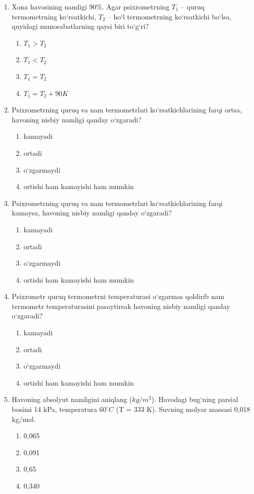 \begin{enumerate}
\item Xona havosining namligi 90\%. Agar psixrometrning $T_1$ – quruq termometrning ko‘rsatkichi, $T_2$ – ho‘l termometrning ko‘rsatkichi bo‘lsa, quyidagi munosabatlarning qaysi biri to‘g‘ri?
\begin{enumerate}[label=\Alph*)]
\item $T_1 > T_2$
\item $T_1 < T_2$
\item $T_1 = T_2$
\item $T_1 = T_2 + 90K$
\end{enumerate}

\item Psixrometrning quruq va nam termometrlari ko‘rsatkichlarining farqi ortsa, havoning nisbiy namligi qanday o‘zgaradi?
\begin{enumerate}[label=\Alph*)]
\item kamayadi
\item ortadi
\item o‘zgarmaydi
\item ortishi ham kamayishi ham mumkin
\end{enumerate}

\item Psixrometrning quruq va nam termometrlari ko‘rsatkichlarining farqi kamaysa, havoning nisbiy namligi qanday o‘zgaradi?
\begin{enumerate}[label=\Alph*)]
\item kamayadi
\item ortadi
\item o‘zgarmaydi
\item ortishi ham kamayishi ham mumkin
\end{enumerate}

\item Psixrometr quruq termometrni temperaturasi o‘zgarmas qoldirib nam termometr temperaturasini pasaytirsak havoning nisbiy namligi qanday o‘zgaradi?
\begin{enumerate}[label=\Alph*)]
\item kamayadi
\item ortadi
\item o‘zgarmaydi
\item ortishi ham kamayishi ham mumkin
\end{enumerate}

\item Havoning absolyut namligini aniqlang ($kg/m^3$). Havodagi bug‘ning parsial bosimi 14 kPa, temperatura $60^\circ C$ (T = 333 K). Suvning molyar massasi 0,018 kg/mol.
\begin{enumerate}[label=\Alph*)]
\item 0,065
\item 0,091
\item 0,65
\item 0,340
\end{enumerate}


\end{enumerate}
